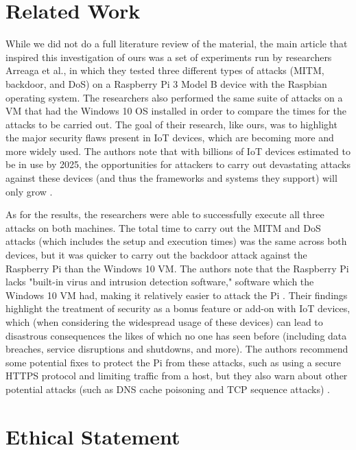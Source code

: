\documentclass[sigconf]{acmart}
\begin{document}
\section{Related Work}
\label{sec:relatedWork}
While we did not do a full literature review of the material, the main article that inspired this investigation of 
ours was a set of experiments run by researchers Arreaga et al., in which they tested three different types 
of attacks (MITM, backdoor, and DoS) on a Raspberry Pi 3 Model B device with the Raspbian operating 
system. The researchers also performed the same suite of attacks on a VM that had the Windows 10 OS 
installed in order to compare the times for the attacks to be carried out. The goal of their research, like ours, 
was to highlight the major security flaws present in IoT devices, which are becoming more and more widely 
used. The authors note that with billions of IoT devices estimated to be in use by 2025, the opportunities for 
attackers to carry out devastating attacks against these devices (and thus the frameworks and systems they 
support) will only grow \cite{ARREAGA2023223}.

As for the results, the researchers were able to successfully execute all three attacks on both machines.
The total time to carry out the MITM and DoS attacks (which includes the setup and execution times) was
the same across both devices, but it was quicker to carry out the backdoor attack against the Raspberry Pi
than the Windows 10 VM. The authors note that the Raspberry Pi lacks "built-in virus and intrusion detection 
software," software which the Windows 10 VM had, making it relatively easier to attack the Pi \cite{ARREAGA2023223}. Their findings
highlight the treatment of security as a bonus feature or add-on with IoT devices, which (when considering the
widespread usage of these devices) can lead to disastrous consequences the likes of which no one has seen
before (including data breaches, service disruptions and shutdowns, and more). The authors recommend
some potential fixes to protect the Pi from these attacks, such as using a secure HTTPS protocol and limiting
traffic from a host, but they also warn about other potential attacks (such as DNS cache poisoning and
TCP sequence attacks) \cite{ARREAGA2023223}.



\section{Ethical Statement}
\end{document}
